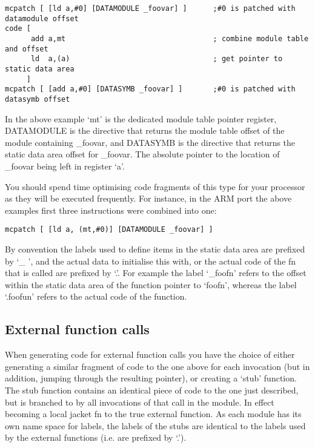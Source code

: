 \scriptsize
\begin{verbatim}
mcpatch [ [ld a,#0] [DATAMODULE _foovar] ]      ;#0 is patched with datamodule offset
code [
      add a,mt                                  ; combine module table and offset
      ld  a,(a)                                 ; get pointer to static data area
     ]
mcpatch [ [add a,#0] [DATASYMB _foovar] ]       ;#0 is patched with datasymb offset
\end{verbatim}
\normalsize
In the above example `mt' is the dedicated module table pointer register,
DATAMODULE is the directive that returns the module table offset of
the module containing \_foovar, and DATASYMB is the directive that returns
the static data area offset for \_foovar. The absolute pointer to the
location of \_foovar being left in register `a'.

You should spend time optimising code fragments of this type for your
processor as they will be executed frequently. For instance, in the ARM
port the above examples first three instructions were combined into one:

\scriptsize
\begin{verbatim}
mcpatch [ [ld a, (mt,#0)] [DATAMODULE _foovar] ]
\end{verbatim}
\normalsize

By convention the labels used to define items in the static data area are
prefixed by `\_ ', and the actual data to initialise this with, or the
actual code of the fn that is called are prefixed by `.'. For example
the label `\_foofn' refers to the offset within the static data area of
the function pointer to `foofn', whereas the label `.foofun' refers to the
actual code of the function.

\subsection{External function calls}

When generating code for external function calls you have the choice of
either generating a similar fragment of code to the one above for each
invocation (but in addition, jumping through the resulting pointer),
or creating a `stub' function. The stub function contains
an identical piece of code to the one just described, but is branched to by all
invocations of that call in the module. In effect becoming a local jacket
fn to the true external function. As each module has its own name space for
labels, the labels of the stubs are identical to the labels used by the
external functions (i.e. are prefixed by `.').

